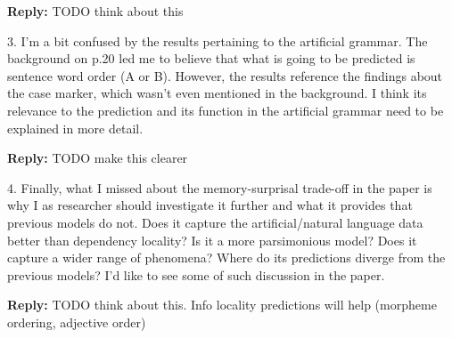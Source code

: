 \documentclass{article}[11pt,a4paper,oneside]
\newenvironment{reply}
  {\par\medskip
   \color{blue}%
   \begin{framed}
   \textbf{Reply: }\ignorespaces}
 {\end{framed}
  \medskip}
\begin{document}
\begin{reply}
	TODO think about this
\end{reply}

3. I'm a bit confused by the results pertaining to the artificial grammar. The background on p.20 led me to believe that what is going to be predicted is sentence word order (A or B). However, the results reference the findings about the case marker, which wasn't even mentioned in the background. I think its relevance to the prediction and its function in the artificial grammar need to be explained in more detail.

\begin{reply}
	TODO make this clearer
\end{reply}

4. Finally, what I missed about the memory-surprisal trade-off in the paper is why I as researcher should investigate it further and what it provides that previous models do not. Does it capture the artificial/natural language data better than dependency locality? Is it a more parsimonious model? Does it capture a wider range of phenomena? Where do its predictions diverge from the previous models? I'd like to see some of such discussion in the paper.

\begin{reply}
	TODO think about this. Info locality predictions will help (morpheme ordering, adjective order)
\end{reply}
\end{document}
